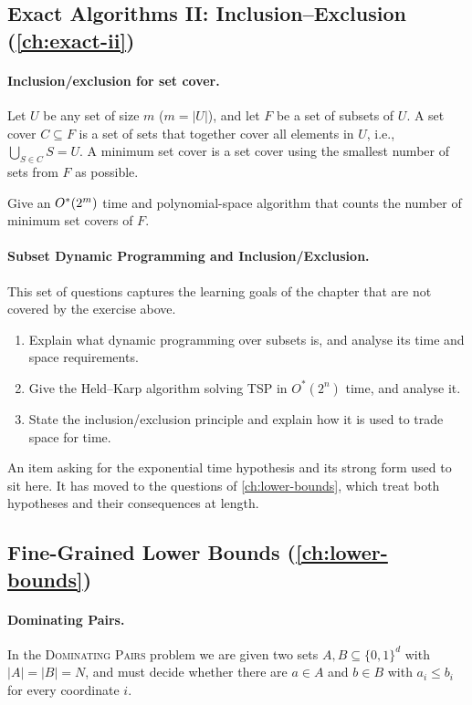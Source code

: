 \subsection*{Exact Algorithms II: Inclusion--Exclusion (\cref{ch:exact-ii})}

\paragraph{Inclusion/exclusion for set cover.}
Let $U$ be any set of size $m$ ($m = |U|$), and let $F$ be a set of subsets of
$U$. A set cover $C \subseteq F$ is a set of sets that together cover all
elements in $U$, i.e., $\bigcup_{S \in C} S = U$. A minimum set cover is a set
cover using the smallest number of sets from $F$ as possible.

Give an $O^{*}(2^m)$ time and polynomial-space algorithm that counts the number
of minimum set covers of $F$.

\paragraph{Subset Dynamic Programming and Inclusion/Exclusion.}
This set of questions captures the learning goals of the chapter that are not
covered by the exercise above.
\begin{enumerate}
  \item Explain what dynamic programming over subsets is, and analyse its time
        and space requirements.
  \item Give the Held--Karp algorithm solving \textsc{TSP} in $O^{*}(2^n)$
        time, and analyse it.
  \item State the inclusion/exclusion principle and explain how it is used to
        trade space for time.
\end{enumerate}

\begin{remark}
An item asking for the exponential time hypothesis and its strong form used to
sit here. It has moved to the questions of \cref{ch:lower-bounds}, which treat
both hypotheses and their consequences at length.
\end{remark}

\subsection*{Fine-Grained Lower Bounds (\cref{ch:lower-bounds})}

\paragraph{Dominating Pairs.}
In the \textsc{Dominating Pairs} problem we are given two sets
$A, B \subseteq \{0,1\}^d$ with $|A| = |B| = N$, and must decide whether there
are $a \in A$ and $b \in B$ with $a_i \le b_i$ for every coordinate $i$.

